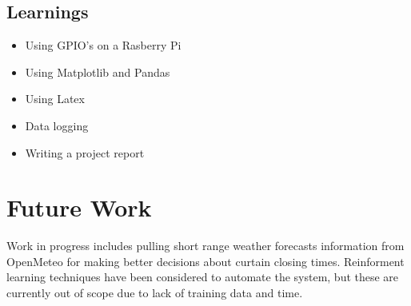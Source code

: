 \documentclass[a4paper,12pt]{article}
\begin{document}
\subsection{Learnings}

\begin{itemize}
    \item Using GPIO's on a Rasberry Pi
    \item Using Matplotlib and Pandas
    \item Using Latex
    \item Data logging
    \item Writing a project report
\end{itemize}

\section{Future Work}

Work in progress includes pulling short range weather forecasts information from OpenMeteo\cite{url:openmeteo} for making better decisions 
about curtain closing times.
Reinforment learning techniques have been considered to automate the system, but these are currently out of scope due to lack of training 
data and time.
\end{document}
